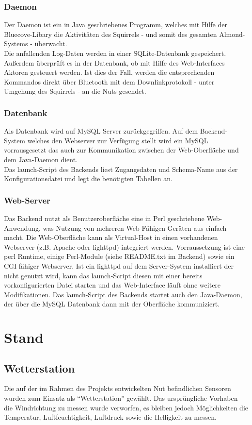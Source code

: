 \documentclass[12pt,a4paper]{article}
\begin{document}
\subsubsection{Daemon}
Der Daemon ist ein in Java geschriebenes Programm, welches mit Hilfe der Bluecove-Libary die Aktivitäten des Squirrels - und somit des gesamten Almond-Systems - überwacht.\\
Die anfallenden Log-Daten werden in einer SQLite-Datenbank gespeichert.\\
Außerdem überprüft es in der Datenbank, ob mit Hilfe des Web-Interfaces Aktoren gesteuert werden. Ist dies der Fall, werden die entsprechenden Kommandos direkt über Bluetooth mit dem Downlinkprotokoll - unter Umgehung des Squirrels - an die Nuts gesendet.\\

\subsubsection{Datenbank}
Als Datenbank wird auf MySQL Server zurückgegriffen. Auf dem Backend-System welches den Webserver zur Verfügung stellt wird ein MySQL vorrausgesetzt das auch zur Kommunikation zwischen der Web-Oberfläche und dem Java-Daemon dient. \\
Das launch-Script des Backends liest Zugangsdaten und Schema-Name aus der Konfigurationsdatei und legt die benötigten Tabellen an.

\subsubsection{Web-Server}
Das Backend nutzt als Benutzeroberfläche eine in Perl geschriebene Web-Anwendung, was Nutzung von mehreren Web-Fähigen Geräten aus einfach macht. Die Web-Oberfläche kann als Virtual-Host in einen vorhandenen Webserver (z.B. Apache oder lighttpd) integriert werden. Vorraussetzung ist eine perl Runtime, einige Perl-Module (siehe README.txt im Backend) sowie ein CGI fähiger Webserver. Ist ein lighttpd auf dem Server-System installiert der nicht genutzt wird, kann das launch-Script diesen mit einer bereits vorkonfigurierten Datei starten und das Web-Interface läuft ohne weitere Modifikationen.
Das launch-Script des Backends startet auch den Java-Daemon, der über die MySQL Datenbank dann mit der Oberfläche kommuniziert.
\section{Stand}
\subsection{Wetterstation}
Die auf der im Rahmen des Projekts entwickelten Nut befindlichen Sensoren wurden zum Einsatz als ``Wetterstation'' gewählt.
Das ursprüngliche Vorhaben die Windrichtung zu messen wurde verworfen, es bleiben jedoch Möglichkeiten die Temperatur, Luftfeuchtigkeit, Luftdruck sowie die Helligkeit zu messen.
\end{document}
